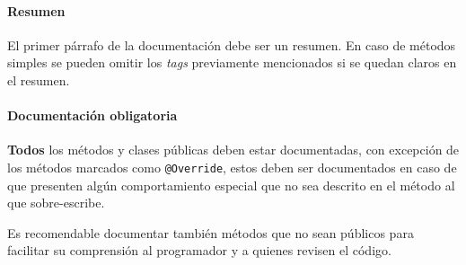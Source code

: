     \paragraph{Resumen}
      El primer párrafo de la documentación debe ser un resumen.
      En caso de métodos simples se pueden omitir los \textit{tags} previamente 
      mencionados si se quedan claros en el resumen.
    \paragraph{Documentación obligatoria}
      \textbf{Todos} los métodos y clases públicas deben estar documentadas, con excepción
      de los métodos marcados como \texttt{@Override}, estos deben ser 
      documentados en caso de que presenten algún comportamiento especial que no sea 
      descrito en el método al que sobre-escribe.

      Es recomendable documentar también métodos que no sean públicos para facilitar su 
      comprensión al programador y a quienes revisen el código.
%